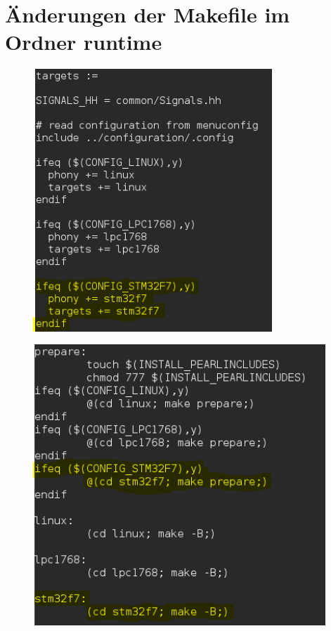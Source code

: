 \section{Änderungen der Makefile im Ordner runtime}\label{Änderungen der Makefile im Ordner runtime}
\begin{figure}[h]
\begin{center}
\includegraphics[width=9cm]{grafiken/Makefile_runtime1.png}
\end{center}
\end{figure}
\clearpage
\begin{figure}[h]
\begin{center}
\includegraphics[width=11cm]{grafiken/Makefile_runtime2.png}
\end{center}
\end{figure}

